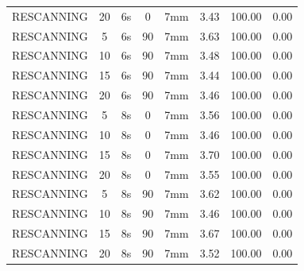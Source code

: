 \documentclass[type=dr, dr=rernat, accentcolor=tud7b,colorbacktitle, bigchapter, openright, twoside, 12pt ]{tudthesis}
\begin{document}
\begin{table}[H]
\begin{tabular}{|c|c||c|c|c||c|c|c|}
RESCANNING & 20 & 6s & 0 & 7mm & 3.43 & 100.00 & 0.00 \\
RESCANNING & 5 & 6s & 90 & 7mm & 3.63 & 100.00 & 0.00 \\
RESCANNING & 10 & 6s & 90 & 7mm & 3.48 & 100.00 & 0.00 \\
RESCANNING & 15 & 6s & 90 & 7mm & 3.44 & 100.00 & 0.00 \\
RESCANNING & 20 & 6s & 90 & 7mm & 3.46 & 100.00 & 0.00 \\
RESCANNING & 5 & 8s & 0 & 7mm & 3.56 & 100.00 & 0.00 \\
RESCANNING & 10 & 8s & 0 & 7mm & 3.46 & 100.00 & 0.00 \\
RESCANNING & 15 & 8s & 0 & 7mm & 3.70 & 100.00 & 0.00 \\
RESCANNING & 20 & 8s & 0 & 7mm & 3.55 & 100.00 & 0.00 \\
RESCANNING & 5 & 8s & 90 & 7mm & 3.62 & 100.00 & 0.00 \\
RESCANNING & 10 & 8s & 90 & 7mm & 3.46 & 100.00 & 0.00 \\
RESCANNING & 15 & 8s & 90 & 7mm & 3.67 & 100.00 & 0.00 \\
RESCANNING & 20 & 8s & 90 & 7mm & 3.52 & 100.00 & 0.00 \\
    \hline\hline 
  \end{tabular}
  \label{tab:pat02:LPV:rescan}
\end{table}

\newpage
\end{document}
